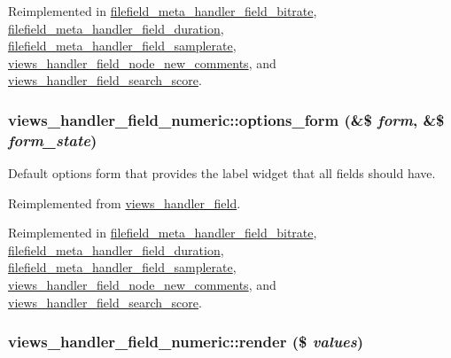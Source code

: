 Reimplemented in \hyperlink{classfilefield__meta__handler__field__bitrate_678b8ef891e4b4024d22e2b914e20b15}{filefield\_\-meta\_\-handler\_\-field\_\-bitrate}, \hyperlink{classfilefield__meta__handler__field__duration_3bf4ecb0dbaa680516e6e27306771dd4}{filefield\_\-meta\_\-handler\_\-field\_\-duration}, \hyperlink{classfilefield__meta__handler__field__samplerate_007d94cba3f5de5e8e0c78e8b3b1ef5a}{filefield\_\-meta\_\-handler\_\-field\_\-samplerate}, \hyperlink{classviews__handler__field__node__new__comments_eea2f5790d310ddcaba82c05593e82e7}{views\_\-handler\_\-field\_\-node\_\-new\_\-comments}, and \hyperlink{classviews__handler__field__search__score_ac88046a858aad74c178cd019b2f236b}{views\_\-handler\_\-field\_\-search\_\-score}.\hypertarget{classviews__handler__field__numeric_e6f81d1896ece64e9450ebc2d60da2fd}{
\subsubsection[{options\_\-form}]{\setlength{\rightskip}{0pt plus 5cm}views\_\-handler\_\-field\_\-numeric::options\_\-form (\&\$ {\em form}, \/  \&\$ {\em form\_\-state})}}
\label{classviews__handler__field__numeric_e6f81d1896ece64e9450ebc2d60da2fd}


Default options form that provides the label widget that all fields should have. 

Reimplemented from \hyperlink{classviews__handler__field_0435d161922b7b4b84f02a2e79bb947a}{views\_\-handler\_\-field}.

Reimplemented in \hyperlink{classfilefield__meta__handler__field__bitrate_74c60e6bbcee2bbaed721a9ed7eea05c}{filefield\_\-meta\_\-handler\_\-field\_\-bitrate}, \hyperlink{classfilefield__meta__handler__field__duration_4c26d6d5b7dad8dce469f82d9bc9c70c}{filefield\_\-meta\_\-handler\_\-field\_\-duration}, \hyperlink{classfilefield__meta__handler__field__samplerate_7ca6744f5ce24aea26f093027538d5ac}{filefield\_\-meta\_\-handler\_\-field\_\-samplerate}, \hyperlink{classviews__handler__field__node__new__comments_2a209d3acbaa47e781df96bc0ca85156}{views\_\-handler\_\-field\_\-node\_\-new\_\-comments}, and \hyperlink{classviews__handler__field__search__score_d3bc7dfcc4859869b75b371c33380abb}{views\_\-handler\_\-field\_\-search\_\-score}.\hypertarget{classviews__handler__field__numeric_9c76aeef951c45385fd91a22e5e656aa}{
\subsubsection[{render}]{\setlength{\rightskip}{0pt plus 5cm}views\_\-handler\_\-field\_\-numeric::render (\$ {\em values})}}
\label{classviews__handler__field__numeric_9c76aeef951c45385fd91a22e5e656aa}


